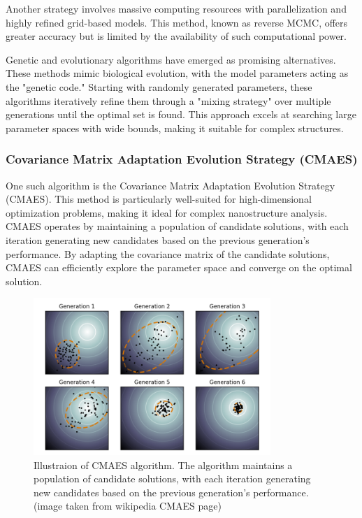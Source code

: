 \medskip

Another strategy involves massive computing resources with parallelization and highly refined grid-based models. This method, known as reverse MCMC, offers greater accuracy but is limited by the availability of such computational power.

\medskip

Genetic and evolutionary algorithms have emerged as promising alternatives. These methods mimic biological evolution, with the model parameters acting as the "genetic code." Starting with randomly generated parameters, these algorithms iteratively refine them through a "mixing strategy" over multiple generations until the optimal set is found. This approach excels at searching large parameter spaces with wide bounds, making it suitable for complex structures.
\cite{hannon2016advancing}
\subsubsection{Covariance Matrix Adaptation Evolution Strategy (CMAES)}

One such algorithm is the Covariance Matrix Adaptation Evolution Strategy (CMAES). This method is particularly well-suited for high-dimensional optimization problems, making it ideal for complex nanostructure analysis. CMAES operates by maintaining a population of candidate solutions, with each iteration generating new candidates based on the previous generation's performance. By adapting the covariance matrix of the candidate solutions, CMAES can efficiently explore the parameter space and converge on the optimal solution.

\begin{figure}[h]
    \centering
    \includegraphics[width=0.8\textwidth]{images/CMAES.png}
    \caption{Illustraion of CMAES algorithm. The algorithm maintains a population of candidate solutions, with each iteration generating new candidates based on the previous generation's performance.(image taken from wikipedia CMAES page) }
    \label{fig:cmaes}
\end{figure}

